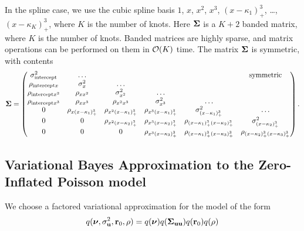
In the spline case, we use the cubic spline basis $1$, $x$, $x^2$, $x^3$, $(x - \kappa_1)^3_+$, \ldots, $(x -
\kappa_K)^3_+$, where $K$ is the number of knots. Here ${\boldsymbol \Sigma}$ is a $K + 2$ banded matrix, where $K$ is the
number of knots. Banded matrices are highly sparse, and matrix operations can be performed on them in
$\mathcal{O}(K)$ time. The matrix ${\boldsymbol \Sigma}$ is symmetric, with contents
\[
	{\boldsymbol \Sigma} =
	\begin{pmatrix}
		\sigma^2_{\text{intercept}} & \ldots                      &                             &                               &                                          & \text{symmetric}              \\
		\rho_{\text{intercept} x} & \sigma^2_x & \ldots\\
		\rho_{\text{intercept} x^2} & \rho_{x x^2} & \sigma^2_{x^2} & \ldots \\
		\rho_{\text{intercept} x^3} & \rho_{x x^3} & \rho_{x^2 x^3} & \sigma^2_{x^3} & \ldots \\
		0                           & \rho_{x (x - \kappa_1)^3_+} & \rho_{x^2 (x-\kappa_1)_+^3} & \rho_{x^3 (x - \kappa_1)_+^3} & \sigma^2_{(x - \kappa_1)_+^3}            & \ldots                        \\
		0                           & 0                           & \rho_{x^2 (x-\kappa_2)_+^3} & \rho_{x^3 (x-\kappa_2)_+^3}   & \rho_{(x-\kappa_1)_+^3 (x-\kappa_2)_+^3} & \sigma^2_{(x - \kappa_2)_+^3} \\
		0 & 0 & 0 & \rho_{x^3 (x - \kappa_3)_+^3} & \rho_{(x - \kappa_1)_+^3 (x - \kappa_3)_+^3} & \rho_{(x - \kappa_2)_+^3 (x - \kappa_3)_+^3}
	\end{pmatrix}.
\]

\subsection{Variational Bayes Approximation to the Zero-Inflated Poisson model}

We choose a factored variational approximation for the model of the form 
\[
	q({\boldsymbol \nu}, \sigma_{{\bf u}}^2,{\bf r}_0, \rho) = q({\boldsymbol \nu}) q({\boldsymbol \Sigma}_{{\bf u} {\bf u}}) q({\bf r}_0) q(\rho)
\]

